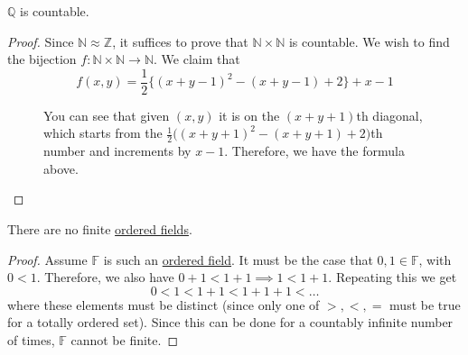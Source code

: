   \begin{theorem}
    \label{thm:rational-numbers}
    $\mathbb{Q}$ is countable. 
  \end{theorem}
  \begin{proof}
    Since $\mathbb{N} \approx \mathbb{Z}$, it suffices to prove that $\mathbb{N} \times \mathbb{N}$ is countable. We wish to find the bijection $f: \mathbb{N} \times \mathbb{N} \rightarrow \mathbb{N}$. We claim that 
    \begin{equation}
      f(x, y) = \frac{1}{2} \big\{ (x + y - 1)^2 - (x + y - 1) + 2 \big\} + x - 1
    \end{equation}
    \begin{figure}[H]
      \centering 
      \caption{You can see that given $(x, y)$ it is on the $(x+y+1)$th diagonal, which starts from the $\frac{1}{2} \big((x+y+1)^2 - (x+y+1) + 2)$th number and increments by $x-1$. Therefore, we have the formula above. } 
      \label{fig:rationals_countable}
    \end{figure}
  \end{proof}

  \begin{theorem}
    \label{thm:finite-fields}
    There are no finite \hyperref[alg-def:ordered-field]{ordered fields}. 
  \end{theorem} 
  \begin{proof}
    Assume $\mathbb{F}$ is such an \hyperref[alg-def:ordered-field]{ordered field}. It must be the case that $0, 1 \in \mathbb{F}$, with $0 < 1$. Therefore, we also have $0 + 1 < 1 + 1 \implies 1 < 1 + 1$. Repeating this we get 
    \begin{equation}
      0 < 1 < 1 + 1 < 1 + 1 + 1 < \ldots
    \end{equation}
    where these elements must be distinct (since only one of $>, <, =$ must be true for a totally ordered set). Since this can be done for a countably infinite number of times, $\mathbb{F}$ cannot be finite. 
  \end{proof}

